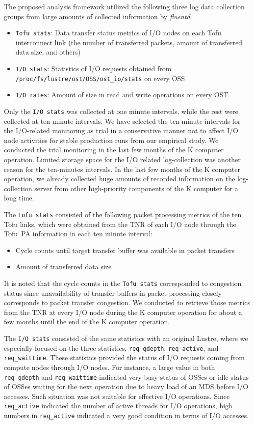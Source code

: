 \documentclass{jhps}
\begin{document}
The proposed analysis framework utilized the following three log data collection groups
from large amounts of collected information by {\itshape fluentd}.
%
\begin{itemize}
\item {\tt Tofu stats}: Data transfer status metrics of I/O nodes on each Tofu interconnect link
(the number of transferred packets, amount of transferred data size, and others)
\item {\tt I/O stats}: Statistics of I/O requests obtained from
{\tt /proc/fs/lustre/ost/OSS/ost\_io/stats} on every OSS
\item {\tt I/O rates}: Amount of size in read and write operations on every OST
\end{itemize}
%
Only the {\tt I/O stats} was collected at one minute intervals,
while the rest were collected at ten minute intervals.
We have selected the ten minute intervals for the I/O-related monitoring as trial
in a conservative manner not to affect I/O node activities for stable production runs
from our empirical study.
We conducted the trial monitoring in the last few months of the K computer operation.
Limited storage space for the I/O related log-collection was another reason
for the ten-minutes intervals.
In the last few months of the K computer operation,
we already collected huge amounts of recorded information
on the log-collection server from other high-priority components
of the K computer for a long time.

The {\tt Tofu stats} consisted of the following packet processing metrics
of the ten Tofu links, which were obtained from the TNR of each I/O node
through the Tofu~PA information in each ten minute interval:
%
\begin{itemize}
\item Cycle counts until target transfer buffer was available in packet transfers
\item Amount of transferred data size
\end{itemize}
%
It is noted that the cycle counts in the {\tt Tofu stats} corresponded to
congestion status since unavailability of transfer buffers in packet processing
closely corresponds to packet transfer congestion.
We conducted to retrieve those metrics from the TNR at every I/O node
during the K computer operation for about a few months
until the end of the K computer operation.

The {\tt I/O stats} consisted of the same statistics with an original Lustre,
where we especially focused on the three statistics,
{\tt req\_qdepth}, {\tt req\_active}, and {\tt req\_waittime}.
These statistics provided the status of I/O requests coming from compute nodes through I/O nodes.
For instance, a large value in both {\tt req\_qdepth} and {\tt req\_waittime} indicated
very busy status of OSSes or idle status of OSSes waiting for the next operation
due to heavy load of an MDS before I/O accesses.
Such situation was not suitable for effective I/O operations.
Since {\tt req\_active} indicated the number of active threads for I/O operations,
high numbers in {\tt req\_active} indicated a very good condition
in terms of I/O accesses.
\end{document}
